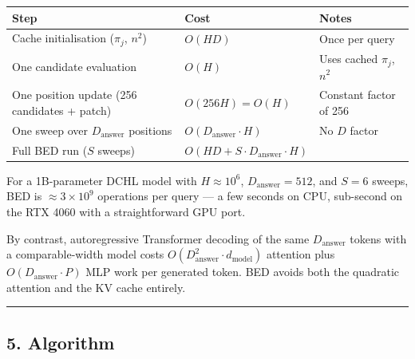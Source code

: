 \documentclass[
  11pt,
  a4paper,
]{article}
\begin{document}
\begin{longtable}[]{@{}
  >{\raggedright\arraybackslash}p{}
  >{\raggedright\arraybackslash}p{}
  >{\raggedright\arraybackslash}p{}@{}}
\toprule\noalign{}
\begin{minipage}[b]{\linewidth}\raggedright
Step
\end{minipage} & \begin{minipage}[b]{\linewidth}\raggedright
Cost
\end{minipage} & \begin{minipage}[b]{\linewidth}\raggedright
Notes
\end{minipage} \\
\midrule\noalign{}
\endhead
\bottomrule\noalign{}
\endlastfoot
Cache initialisation (\(\pi_j\), \(n^2\)) & \(O(HD)\) & Once per
query \\
One candidate evaluation & \(O(H)\) & Uses cached \(\pi_j\), \(n^2\) \\
One position update (256 candidates + patch) & \(O(256 H) = O(H)\) &
Constant factor of 256 \\
One sweep over \(D_{\text{answer}}\) positions &
\(O(D_{\text{answer}} \cdot H)\) & No \(D\) factor \\
Full BED run (\(S\) sweeps) &
\(O(HD + S \cdot D_{\text{answer}} \cdot H)\) & \\
\end{longtable}

For a 1B-parameter DCHL model with \(H \approx 10^6\),
\(D_{\text{answer}} = 512\), and \(S = 6\) sweeps, BED is
\(\approx 3 \times 10^9\) operations per query --- a few seconds on CPU,
sub-second on the RTX 4060 with a straightforward GPU port.

By contrast, autoregressive Transformer decoding of the same
\(D_{\text{answer}}\) tokens with a comparable-width model costs
\(O(D_{\text{answer}}^2 \cdot d_{\text{model}})\) attention plus
\(O(D_{\text{answer}} \cdot P)\) MLP work per generated token. BED
avoids both the quadratic attention and the KV cache entirely.

\begin{center}\rule{0.5\linewidth}{0.5pt}\end{center}

\subsection{5. Algorithm}\label{algorithm}
\end{document}
